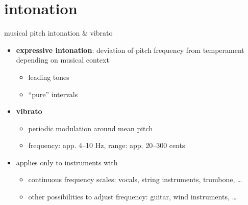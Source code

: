     \section{intonation}
        \begin{frame}{musical pitch}{ intonation \& vibrato}
            \begin{itemize}
                \item	\textbf{expressive intonation}: deviation of pitch frequency from temperament depending on musical context
                        \begin{itemize}
                            \item	leading tones
                            \item	``pure'' intervals
                        \end{itemize}

                \item<2->	\textbf{vibrato}
                        \begin{itemize}
                            \item	periodic modulation around mean pitch
                            \pause
                            \item 	frequency: app. 4--10 \unit{Hz}, range: app. 20--300 \unit{cents}	
                        \end{itemize}
                \bigskip
                \item<3-> applies only to instruments with
                    \begin{itemize}
                        \item<4->   continuous frequency scales: vocals, string instruments, trombone, \ldots
                        \item<5->   other possibilities to adjust frequency: guitar, wind instruments, \ldots
                    \end{itemize}
            \end{itemize}
        \end{frame}
        
